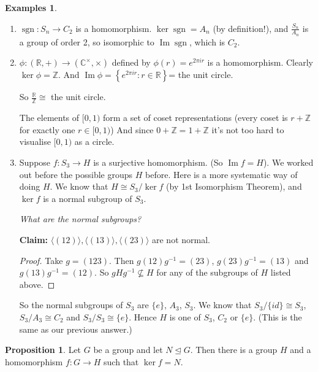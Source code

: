 \documentclass{article}
\theoremstyle{definition}
\newtheorem{proposition}{Proposition}
\newtheorem*{exmps}{Examples}
\newcommand{\gene}[1]{\langle #1 \rangle}
\newcommand{\func}[3]{#1 : #2 \rightarrow #3}
\newcommand{\integers}{\mathbb{Z}}
\newcommand{\reals}{\mathbb{R}}
\newcommand{\complexes}{\mathbb{C}}
\newcommand{\ism}{\cong}
\DeclareMathOperator{\sgn}{sgn}
\DeclareMathOperator{\Ima}{Im}
\begin{document}
\begin{exmps}\hfill
  \begin{enumerate}
    \item $\func{\sgn}{S_n}{C_2}$ is a homomorphism.
      $\ker \sgn = A_n$ (by definition!), and $\frac{S_n}{A_n}$ is a group of order 2, so isomorphic to $\Ima \sgn$, which is $C_2$.
    \item $\func{\phi}{(\reals,+)}{(\complexes^\times,\times)}$ defined by $\phi(r)=e^{2\pi i r}$ is a homomorphism.
      Clearly $\ker \phi = \integers$.
      And $\Ima \phi = \left\{ e^{2\pi i r} : r \in \reals \right\}$= the unit circle.

      So $\frac{\reals}{\integers}\ism$ the unit circle.


      The elements of $[0,1)$ form a set of coset representations (every coset is $r+\integers$ for exactly one $r \in [0,1)$) And since $0+\integers = 1+\integers$ it's not too hard to visualise $[0,1)$ as a circle.

      \item Suppose $f:S_3 \rightarrow H$ is a surjective homomorphism. (So $\Ima f = H$). We worked out before the possible groups $H$ before. Here is a more systematic way of doing $H$. We know that $H \ism S_3/\ker f$ (by 1st Isomorphism Theorem), and $\ker f$ is a normal subgroup of $S_3$.

        \emph{What are the normal subgroups?}

        \textbf{Claim:} $\gene{(12)},\gene{(13)}, \gene{(23)}$ are not normal.

        \begin{proof}
          Take $g=(123)$. Then $g(12)g^{-1}=(23)$, $g(23)g^{-1}=(13)$ and $g(13)g^{-1}=(12)$. So $gHg^{-1} \not\subseteq H$ for any of the subgroups of $H$ listed above.
        \end{proof}
          So the normal subgroups of $S_3$ are $\{e\}$, $A_3$, $S_3$. We know that $S_3/\{id\} \ism S_3$, $S_3/A_3 \ism C_2$ and $S_3/S_3 \ism \{e\}$. Hence $H$ is one of $S_3$, $C_2$ or $\{e\}$. (This is the same as our previous answer.)\\
  \end{enumerate}
\end{exmps}

  \begin{proposition}
    Let $G$ be a group and let $N \trianglelefteq G$. Then there is a group $H$ and a homomorphism $f : G \rightarrow H$ such that $\ker f = N$.
  \end{proposition}
\end{document}
